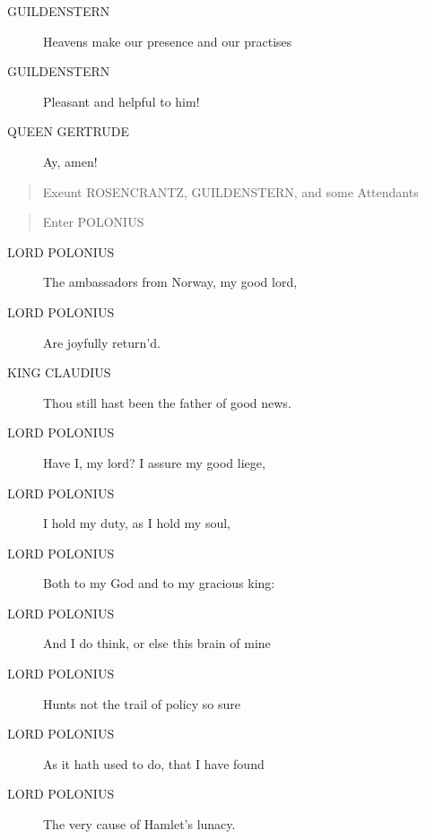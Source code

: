 \documentclass{article}
\begin{document}
\begin{description}
            
\item[GUILDENSTERN] Heavens make our presence and our practises
\item[GUILDENSTERN] Pleasant and helpful to him!
\end{description}
          
\begin{description}
            
\item[QUEEN GERTRUDE] Ay, amen!
\end{description}
          
\begin{quote}
Exeunt ROSENCRANTZ, GUILDENSTERN, and some
Attendants
\end{quote}
          
\begin{quote}
Enter POLONIUS
\end{quote}
          
\begin{description}
            
\item[LORD POLONIUS] The ambassadors from Norway, my good lord,
\item[LORD POLONIUS] Are joyfully return'd.
\end{description}
          
\begin{description}
            
\item[KING CLAUDIUS] Thou still hast been the father of good news.
\end{description}
          
\begin{description}
            
\item[LORD POLONIUS] Have I, my lord? I assure my good liege,
\item[LORD POLONIUS] I hold my duty, as I hold my soul,
\item[LORD POLONIUS] Both to my God and to my gracious king:
\item[LORD POLONIUS] And I do think, or else this brain of mine
\item[LORD POLONIUS] Hunts not the trail of policy so sure
\item[LORD POLONIUS] As it hath used to do, that I have found
\item[LORD POLONIUS] The very cause of Hamlet's lunacy.
\end{description}
          
\end{document}
